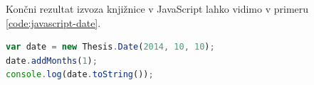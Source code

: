 Končni rezultat izvoza knjižnice v JavaScript lahko vidimo v primeru \ref{code:javascript-date}.

\begin{lstlisting}[caption={Primer uporabe izvoženega razreda \texttt{Date} v JavaScript.}, label=code:javascript-date, language=JavaScript]
var date = new Thesis.Date(2014, 10, 10);
date.addMonths(1);
console.log(date.toString());
\end{lstlisting}